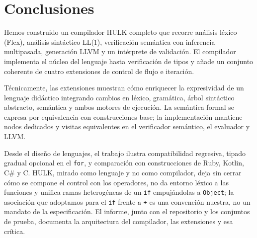 \documentclass[11pt,a4paper]{article}
\begin{document}
\section{Conclusiones}

Hemos construido un compilador HULK completo que recorre análisis léxico (Flex), análisis sintáctico LL(1), verificación semántica con inferencia multipasada, generación LLVM y un intérprete de validación. El compilador implementa el núcleo del lenguaje hasta verificación de tipos y añade un conjunto coherente de cuatro extensiones de control de flujo e iteración.

Técnicamente, las extensiones muestran cómo enriquecer la expresividad de un lenguaje didáctico integrando cambios en léxico, gramática, árbol sintáctico abstracto, semántica y ambos motores de ejecución. La semántica formal se expresa por equivalencia con construcciones base; la implementación mantiene nodos dedicados y visitas equivalentes en el verificador semántico, el evaluador y LLVM.

Desde el diseño de lenguajes, el trabajo ilustra compatibilidad regresiva, tipado gradual opcional en el \texttt{for}, y comparación con construcciones de Ruby, Kotlin, C\# y C. HULK, mirado como lenguaje y no como compilador, deja sin cerrar cómo se compone el control con los operadores, no da entorno léxico a las funciones y unifica ramas heterogéneas de un \texttt{if} empujándolas a \texttt{Object}; la asociación que adoptamos para el \texttt{if} frente a \texttt{+} es una convención nuestra, no un mandato de la especificación. El informe, junto con el repositorio y los conjuntos de prueba, documenta la arquitectura del compilador, las extensiones y esa crítica.
\end{document}
